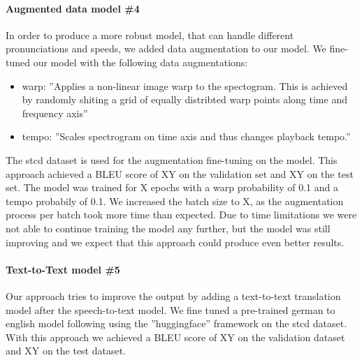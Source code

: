 \paragraph{Augmented data model \#4} In order to produce a more robust model, that can handle different pronunciations and speeds, we added data augmentation to our  model. We fine-tuned our
model with the following data augmentations:
\begin{itemize}
    \item warp: ''Applies a non-linear image warp to the spectogram. This is achieved by randomly shiting a grid of equally distribted warp points along time and frequency axis''
    \cite{DeepSpeechAugmentation}
    \item tempo: ''Scales spectrogram on time axis and thus changes playback tempo.'' \cite{DeepSpeechAugmentation}
\end{itemize}

The \gls{stcd} dataset is used for the augmentation fine-tuning on the  model. This approach achieved a BLEU score of XY on the validation set and XY on the test set. The model was trained for
X epochs with a warp probability of 0.1 and a tempo probabily of 0.1. We increased the batch size to X, as the augmentation process per batch took more time than expected. Due to time limitations we
were not able to continue training the model any further, but the model was still improving and we expect that this approach could produce even better results.
\paragraph{Text-to-Text model \#5} Our  approach tries to improve the output by adding a text-to-text translation model after the speech-to-text model. We fine tuned a pre-trained german to
english model following  using the ''huggingface'' framework \cite{wolf-etal-2020-transformers} on the \gls{stcd} dataset. With this approach we achieved a BLEU score of XY on the validation dataset and
XY on the test dataset.
